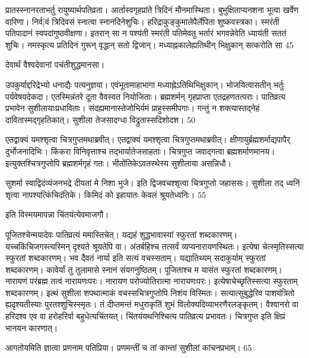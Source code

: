  प्रातस्स्नानरताभर्तु रायुष्यार्थपतिव्रता।
 आर्तास्वगृहप्रांते त्रिदिनं मौनमास्थिता।
 बुभुक्षिताप्यनशना भूत्वा खर्वेण वारिणा।
 निर्व]वं त्रिदिवसं स्नात्वा स्नानदिनेशुचिः।
 हरिद्राकुङ्कुमालेपैर्लेपिता शुष्कवस्त्रका।
 स्मरंती पतिपादानं स्वपदांगुष्ठवीक्षणा।
 इतरान् सा न पश्यंती स्मरंती पतिमेवतु भर्तारं भगवन्नेवेति ध्यायंती सततं शुचिः।
 नमस्कृत्य प्रतिदिनं गुरून् वृद्धान् सतो द्विजान्।
 मध्याह्नकालेह्यतिथीन् भिक्षुकान् सत्करोति सा 45

  देवार्थं वैश्वदेवानां पचंतीशुद्धमानसा।
 
उपकुर्याद्दरिद्रेभ्यो धनाद्यैः पत्यनुज्ञया।
 एवंभूतामाहाभागा मध्याह्नेऽतिथिभिक्षुकान्।
 भोजयित्वासतीन् भर्तुः पर्यवेषयदेकदा।
 एतस्मिन्नंतरे दूता वैवस्वत नियोजिताः।
 ब्रह्मशर्मन् गृहप्राप्ता एतद्रहणतत्पराः।
 पातिव्रत्य प्रभावेन सुशीलायाःप्रधाविताः।
 संदह्यमानास्तेजोभिर्यमं प्राहुस्समीपगाः।
 गन्तुं न शक्त्यास्तद्नेहं दावितास्मद्गृहतिकात्।
 सुशीला तेजसादग्धा विद्रुतास्सदिशोदश।
 50

  एतद्वाक्यं यमश्शृत्वा चित्रगुप्तमथाब्रवीत्।
 एतद्वाक्यं यमश्शृत्वा चित्रगुप्तमथाब्रवीत्।
 क्षीणायुर्ब्रह्मशर्माद्यपापैर् दुर्भोजनादिभिः।
 किंकरा विनिवृत्ताश्च तद्भार्यातेजसाहताः।
 चित्रगुप्त जवाद्गत्वा ब्रह्मशर्माणमानय।
 इत्युक्तश्चित्रगुप्तोपि ब्रह्मशर्मगृहं गतः।
 भीतोंतिकेऽवतस्थेस्य सुशीलाया असन्निधौ।
 
सुशर्मा
स्वाद्विदंव्यंजनभद्रे दीयतां मे निशा भुजे।
 इति द्विजवचश्शृत्वा चित्रगुप्तो जहाससः।
 सुशीला तद् ध्वनिं शृत्वा नापश्यत्किंचिदंतिके।
 किमिदं को इहायातः केवलं श्रूयतेध्वनिः।
 55

  इति विस्मयमापन्ना चिंतयंत्येवमाजगौ।
 
पूजितश्चेन्मयादेवः पातिव्रत्यं ममास्तिचेत्।
 यद्यहं शुद्धभावास्यां स्फुरतां शब्दकारणम्।
 यच्चकिंचिजगस्त्यस्मिन् दृश्यते श्रूयतेपि वा।
 अंतर्बहिश्च तत्सर्वं व्यप्यनारायणस्थितः।
 इत्येषा चेत्स्मृतिस्सत्या स्फुरतां शब्दकारणम्।
 भव दैवतं नार्या इति सत्यं वचस्सताम्।
 यद्यातिथ्यम् सदाकुर्याम् स्फुरतां शब्दकारणम्।
 कावेर्यां तु तुलामासे स्नानं संयगनुष्ठितम्।
 पूजिताश्च म यासंत स्फुरतां शब्दकारणम्।
 नारायणं परंब्रह्म तत्वं नारायणःपरः।
 नारायण परोज्योतिरात्मा नारायणःपरः।
 इत्येषाचेच्छृतिस्सत्या स्फुरताम् शब्दकारणम्।
 इत्थं सुशीला शपथात्माकं
वचस्सचित्रगुप्तोपि निशंय विस्मितः।
 सत्यात्सुबुद्धेरिव पाशयंत्रितो
ह्यदृश्यतीस्याः पुरतश्शुचिस्स्मृतः।
 तं दीप्तमन्तं मधुराकृतिं
शुभं विलोक्यदिव्याभरणैरलङ्कृतम्।
 वैश्वानरो वा हरिदश्व एव वा
हरोहरिर्वा बहुधेत्यचिंतयत्।
 चिंतयंयथनिश्चित्य पातिव्रत्य प्रभावतः।
 चित्रगुप्त इति क्षिप्रं भानयन कारणात्।
 
आगतोयमिति ज्ञात्वा प्रणनाम पतिप्रिया।
 प्रणमन्तीं च तां कान्तां सुशीलां कांचनप्रभाम्।
 65

